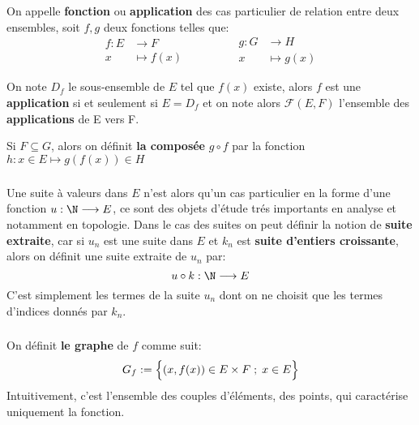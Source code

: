 \chapter*{}

On appelle \textbf{fonction} ou \textbf{application} des cas particulier de relation entre deux ensembles, soit \(f, g\) deux fonctions telles que:
\[
   \begin{aligned}
      f: E &\longrightarrow F\\
      x &\longmapsto f(x)
   \end{aligned}
      \hspace{50pt}
   \begin{aligned}
      g: G&\longrightarrow H\\
      x&\longmapsto g(x)
   \end{aligned}
\]

On note \(D_f\) le sous-ensemble de \(E\) tel que \(f(x)\) existe, alors \(f\) est une \textbf{application} si et seulement si \(E = D_f\) et on note alors \(\mathscr{F}(E, F)\) l'ensemble des \textbf{applications} de E vers F.\<

Si \(F \subseteq G\), alors on définit \textbf{la composée} \(g \circ f\) par la fonction \(h: x \in E \longmapsto g(f(x)) \in H\)

\subsection*{}
Une suite à valeurs dans \(E\) n'est alors qu'un cas particulier en la forme d'une fonction \(u : \N \longrightarrow E\), ce sont des objets d'étude trés importants en analyse et notamment en topologie. Dans le cas des suites on peut définir la notion de \textbf{suite extraite}, car si \(u_n\) est une suite dans \(E\) et \(k_n\) est \textbf{suite d'entiers croissante}, alors on définit une suite extraite de \(u_n\) par:
\[
   u \circ k : \N \longrightarrow E
\]
C'est simplement les termes de la suite \(u_n\) dont on ne choisit que les termes d'indices donnés par \(k_n\).
\subsection*{}
On définit \textbf{le graphe} de \(f\) comme suit:
\[
   G_f:= \Bigl\{ (x, f(x)) \in E \times F \; ; \; x \in E\Bigl\}   
\]
Intuitivement, c'est l'ensemble des couples d'éléments, des points, qui caractérise uniquement la fonction.
